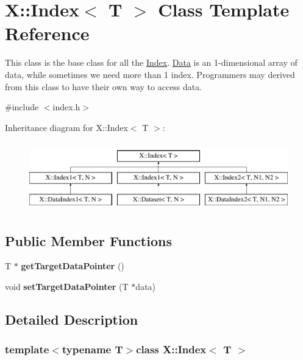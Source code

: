 \hypertarget{class_x_1_1_index}{\section{X\-:\-:Index$<$ T $>$ Class Template Reference}
\label{class_x_1_1_index}
}


This class is the base class for all the \hyperlink{class_x_1_1_index}{Index}. \hyperlink{class_x_1_1_data}{Data} is an 1-\/dimensional array of data, while sometimes we need more than 1 index. Programmers may derived from this class to have their own way to access data.  




{\ttfamily \#include $<$index.\-h$>$}

Inheritance diagram for X\-:\-:Index$<$ T $>$\-:\begin{figure}[H]
\begin{center}
\leavevmode
\includegraphics[height=3.000000cm]{class_x_1_1_index}
\end{center}
\end{figure}
\subsection*{Public Member Functions}
\begin{DoxyCompactItemize}
\item 
\hypertarget{class_x_1_1_index_aa61272169a7dd0ab80ea7a7de771c62e}{T $\ast$ {\bfseries get\-Target\-Data\-Pointer} ()}\label{class_x_1_1_index_aa61272169a7dd0ab80ea7a7de771c62e}

\item 
\hypertarget{class_x_1_1_index_a1de180b669777c349047cb3ec10cca48}{void {\bfseries set\-Target\-Data\-Pointer} (T $\ast$data)}\label{class_x_1_1_index_a1de180b669777c349047cb3ec10cca48}

\end{DoxyCompactItemize}


\subsection{Detailed Description}
\subsubsection*{template$<$typename T$>$class X\-::\-Index$<$ T $>$}

